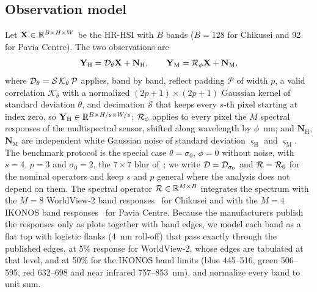 \documentclass[journal]{IEEEtran}
\begin{document}
\subsection{Observation model}
Let $\mathbf{X}\in\mathbb{R}^{B\times H\times W}$ be the HR-HSI with $B$ bands ($B=128$ for Chikusei and 92 for Pavia Centre). The two observations are
\begin{equation}
\mathbf{Y}_{\mathrm{H}} = \mathcal{D}_\theta\mathbf{X}+\mathbf{N}_{\mathrm{H}},\qquad \mathbf{Y}_{\mathrm{M}} = \mathcal{R}_\phi\mathbf{X}+\mathbf{N}_{\mathrm{M}},
\label{eq:obs}
\end{equation}
where $\mathcal{D}_\theta=\mathcal{S}\,\mathcal{K}_\theta\,\mathcal{P}$ applies, band by band, reflect padding $\mathcal{P}$ of width $p$, a valid correlation $\mathcal{K}_\theta$ with a normalized $(2p+1)\times(2p+1)$ Gaussian kernel of standard deviation $\theta$, and decimation $\mathcal{S}$ that keeps every $s$-th pixel starting at index zero, so $\mathbf{Y}_{\mathrm{H}}\in\mathbb{R}^{B\times H/s\times W/s}$; $\mathcal{R}_\phi$ applies to every pixel the $M$ spectral responses of the multispectral sensor, shifted along wavelength by $\phi$~nm; and $\mathbf{N}_{\mathrm{H}}$, $\mathbf{N}_{\mathrm{M}}$ are independent white Gaussian noise of standard deviation $\varsigma_{\mathrm{H}}$ and $\varsigma_{\mathrm{M}}$. The benchmark protocol is the special case $\theta=\sigma_0$, $\phi=0$ without noise, with $s=4$, $p=3$ and $\sigma_0=2$, the $7\times7$ blur of~\cite{chen2026twostage}; we write $\mathcal{D}=\mathcal{D}_{\sigma_0}$ and $\mathcal{R}=\mathcal{R}_0$ for the nominal operators and keep $s$ and $p$ general where the analysis does not depend on them. The spectral operator $\mathcal{R}\in\mathbb{R}^{M\times B}$ integrates the spectrum with the $M=8$ WorldView-2 band responses~\cite{digitalglobe2014srf} for Chikusei and with the $M=4$ IKONOS band responses~\cite{dial2003ikonos} for Pavia Centre. Because the manufacturers publish the responses only as plots together with band edges, we model each band as a flat top with logistic flanks (4~nm roll-off) that pass exactly through the published edges, at 5\% response for WorldView-2, whose edges are tabulated at that level, and at 50\% for the IKONOS band limits (blue 445--516, green 506--595, red 632--698 and near infrared 757--853~nm), and normalize every band to unit sum.
\end{document}
